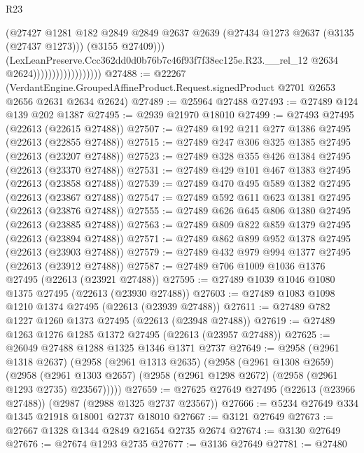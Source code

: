 \begin{lexlean}{R23}
\begin{coremodule}
                                        (@27427
                                          @1281
                                          @182
                                          @2849
                                          @2849
                                          @2637
                                          @2639
                                          (@27434 @1273 @2637 (@3135 (@27437 @1273)))
                                          (@3155 @27409)))
                                      (LexLeanPreserve.Ccc362dd0d0b76b7c46f93f7f38ec125e.R23.__rel_12
                                        @2634
                                        @2624))))))))))))))))))
@27488 := @22267
    (VerdantEngine.GroupedAffineProduct.Request.signedProduct @2701 @2653 @2656 @2631 @2634 @2624)
@27489 := @25964 @27488
@27493 := @27489 @124 @139 @202 @1387
@27495 := @2939 @21970 @18010
@27499 := @27493 @27495 (@22613 (@22615 @27488))
@27507 := @27489 @192 @211 @277 @1386 @27495 (@22613 (@22855 @27488))
@27515 := @27489 @247 @306 @325 @1385 @27495 (@22613 (@23207 @27488))
@27523 := @27489 @328 @355 @426 @1384 @27495 (@22613 (@23370 @27488))
@27531 := @27489 @429 @101 @467 @1383 @27495 (@22613 (@23858 @27488))
@27539 := @27489 @470 @495 @589 @1382 @27495 (@22613 (@23867 @27488))
@27547 := @27489 @592 @611 @623 @1381 @27495 (@22613 (@23876 @27488))
@27555 := @27489 @626 @645 @806 @1380 @27495 (@22613 (@23885 @27488))
@27563 := @27489 @809 @822 @859 @1379 @27495 (@22613 (@23894 @27488))
@27571 := @27489 @862 @899 @952 @1378 @27495 (@22613 (@23903 @27488))
@27579 := @27489 @432 @979 @994 @1377 @27495 (@22613 (@23912 @27488))
@27587 := @27489 @706 @1009 @1036 @1376 @27495 (@22613 (@23921 @27488))
@27595 := @27489 @1039 @1046 @1080 @1375 @27495 (@22613 (@23930 @27488))
@27603 := @27489 @1083 @1098 @1210 @1374 @27495 (@22613 (@23939 @27488))
@27611 := @27489 @782 @1227 @1260 @1373 @27495 (@22613 (@23948 @27488))
@27619 := @27489 @1263 @1276 @1285 @1372 @27495 (@22613 (@23957 @27488))
@27625 := @26049 @27488 @1288 @1325 @1346 @1371 @2737
@27649 := @2958
    (@2961 @1318 @2637)
    (@2958
      (@2961 @1313 @2635)
      (@2958
        (@2961 @1308 @2659)
        (@2958 (@2961 @1303 @2657) (@2958 (@2961 @1298 @2672) (@2958 (@2961 @1293 @2735) @23567)))))
@27659 := @27625 @27649 @27495 (@22613 (@23966 @27488)) (@2987 (@2988 @1325 @2737 @23567))
@27666 := @5234 @27649 @334 @1345 @21918 @18001 @2737 @18010
@27667 := @3121 @27649
@27673 := @27667 @1328 @1344 @2849 @21654 @2735 @2674
@27674 := @3130 @27649
@27676 := @27674 @1293 @2735
@27677 := @3136 @27649
@27781 := @27480

\end{coremodule}
\end{lexlean}
